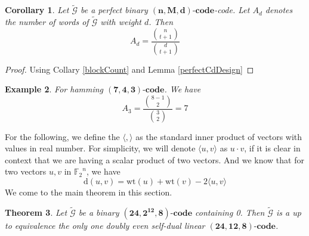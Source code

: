 \documentclass{article}
\newtheorem{theorem}{Theorem}[section]
\newtheorem{example}[theorem]{Example}
\newtheorem{collary}[theorem]{Corollary}
\numberwithin{equation}{theorem}
\numberwithin{figure}{theorem}
\newcommand{\cCodes}{\ensuremath{\widetilde{\mathscr{G}}}}
\newcommand{\code}[3]{\ensuremath{\bm{(#1,#2,#3)\mbox{-}code}}}
\newcommand{\linearCode}[3]{\ensuremath{\bm{(#1,#2,#3)\mbox{-}code}}}
\newcommand{\ftwoN}[1]{\ensuremath{\mathbb{F}_2}^{#1}}
\newcommand{\wt}[1]{\ensuremath{\text{wt}(#1)}}
\newcommand{\dist}[2]{\ensuremath{\text{d}(#1,#2)}}
\begin{document}
\begin{collary}\label{perfectCodeAd}
Let {\cCodes} be a perfect binary \code{n}{M}{d}-code. Let $A_d$ denotes the number of words of {\cCodes} with weight $d$. Then
\[
	A_d = \frac{\binom{n}{t+1}}{\binom{d}{t+1}}
\]
\end{collary}
\begin{proof}
	Using Collary \ref{blockCount}  and Lemma \ref{perfectCdDesign}
\end{proof}
\begin{example}
For hamming \linearCode{7}{4}{3}. We have
\[
	A_3 = \frac{\binom{8-1}{2}}{\binom{3}{2}} = 7
\]
\end{example}
For the following, we define the $\langle , \rangle$ as the standard inner product of vectors with values in real number. 
For simplicity, we will denote $\langle u,v \rangle$ as $u \cdot v$, if it is clear in context that we are having a scalar product of two vectors. And we know that for two vectors $u,v$ in $\ftwoN{n}$, we have
\begin{equation}\label{distWeightEqn}
	\dist{u}{v} = \wt{u} + \wt{v} - 2\langle u, v\rangle 
\end{equation}
We come to the main theorem in this section.
\begin{theorem}
Let {\cCodes} be a binary {\code{24}{2^{12}}{8}} containing 0. Then {\cCodes} is a up to equivalence the only one doubly even self-dual linear {\linearCode{24}{12}{8}}. 
\end{theorem}
\end{document}
